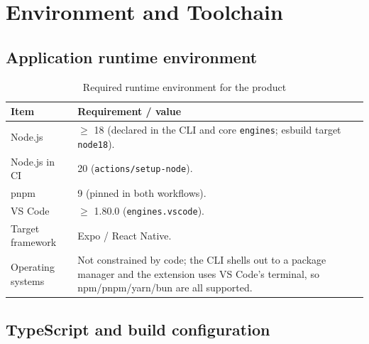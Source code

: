 \chapter{Environment and Toolchain}
\label{app:environment}

\section{Application runtime environment}

\begin{longtable}{p{5.4cm}p{8.8cm}}
\caption{Required runtime environment for the product}\\
\toprule
\textbf{Item} & \textbf{Requirement / value} \\
\midrule

Node.js & $\geq$ 18 (declared in the CLI and core \texttt{engines}; esbuild target
\texttt{node18}). \\
Node.js in CI & 20 (\texttt{actions/setup-node}). \\
pnpm & 9 (pinned in both workflows). \\
VS Code & $\geq$ 1.80.0 (\texttt{engines.vscode}). \\
Target framework & Expo / React Native. \\
Operating systems & Not constrained by code; the CLI shells out to a package
manager and the extension uses VS Code's terminal, so npm/pnpm/yarn/bun are all
supported. \\
\bottomrule
\end{longtable}

\section{TypeScript and build configuration}

